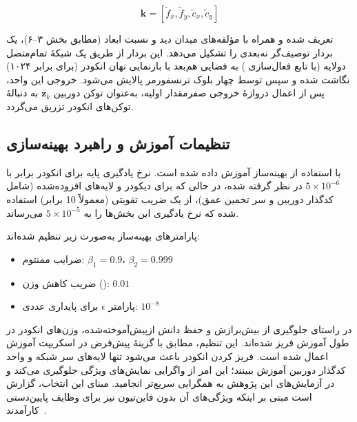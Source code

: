 \begin{equation}
\mathbf{k} = [\tilde{f}_x, \tilde{f}_y, \tilde{c}_x, \tilde{c}_y]
\end{equation}

تعریف شده و همراه با مؤلفه‌های میدان دید و نسبت ابعاد (مطابق بخش ۳--۶)، یک بردار توصیف‌گر نه‌بعدی را تشکیل می‌دهد. این بردار از طریق یک شبکهٔ تمام‌متصل دولایه (با تابع فعال‌سازی ) به فضایی هم‌بعد با بازنمایی نهان انکودر (برای  برابر ۱۰۲۴) نگاشت شده و سپس توسط چهار بلوک ترنسفورمر پالایش می‌شود. خروجی این واحد، پس از اعمال دروازهٔ خروجی صفرمقدار اولیه، به‌عنوان توکن دوربین $\mathbf{z}_k$ به دنبالهٔ توکن‌های انکودر تزریق می‌گردد.
\subsection{تنظیمات آموزش و راهبرد بهینه‌سازی}

\proposedmodel{} با استفاده از بهینه‌ساز  \cite{Loshchilov2019AdamW} آموزش داده شده است. نرخ یادگیری پایه برای انکودر  برابر با $5 \times 10^{-6}$ در نظر گرفته شده، در حالی که برای دیکودر و لایه‌های افزوده‌شده (شامل کدگذار دوربین و سر تخمین عمق)، از یک ضریب تقویتی (معمولاً 10 برابر) استفاده شده که نرخ یادگیری این بخش‌ها را به $5 \times 10^{-5}$ می‌رساند.

پارامترهای بهینه‌ساز به‌صورت زیر تنظیم شده‌اند:

\begin{itemize}
    \item ضرایب ممنتوم: $\beta_1 = 0.9$، $\beta_2 = 0.999$
    \item ضریب کاهش وزن (): $0.01$
    \item پارامتر $\epsilon$ برای پایداری عددی: $10^{-8}$
\end{itemize}

در راستای جلوگیری از بیش‌برازش و حفظ دانش ازپیش‌آموخته‌شده، وزن‌های انکودر  در طول آموزش فریز شده‌اند. این تنظیم، مطابق با گزینهٔ پیش‌فرض  در اسکریپت آموزش اعمال شده است. فریز کردن انکودر باعث می‌شود تنها لایه‌های سر شبکه و واحد کدگذار دوربین آموزش ببینند؛ این امر از واگرایی نمایش‌های ویژگی جلوگیری می‌کند و در آزمایش‌های این پژوهش به همگرایی سریع‌تر انجامید. مبنای این انتخاب، گزارش  است مبنی بر اینکه ویژگی‌های آن بدون فاین‌تیون نیز برای وظایف پایین‌دستی کارآمدند~\cite{Oquab2023DINOv2}.

